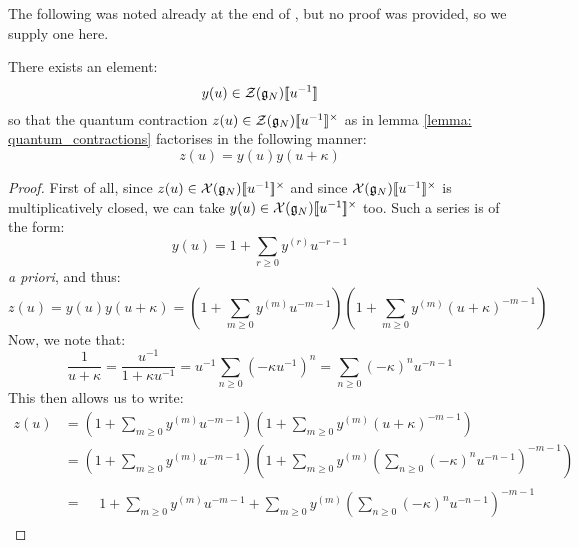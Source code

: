             The following was noted already at the end of \cite[Section 2]{guay_regelskis_twisted_yangians_for_symmetric_pairs_of_types_BCD}, but no proof was provided, so we supply one here.
            \begin{lemma} \label{lemma: quantum_pfaffians}
                There exists an element:
                    $$y(u) \in \calZ(\g_N)[\![u^{-1}]\!]$$
                so that the quantum contraction $z(u) \in \calZ(\g_N)[\![u^{-1}]\!]^{\x}$ as in lemma \ref{lemma: quantum_contractions} factorises in the following manner:
                    \begin{equation} \label{equation: quantum_pfaffians}
                        z(u) = y(u) y(u + \kappa)
                    \end{equation}
            \end{lemma}
                \begin{proof}
                    First of all, since $z(u) \in \calX(\g_N)[\![u^{-1}]\!]^{\x}$ and since $\calX(\g_N)[\![u^{-1}]\!]^{\x}$ is multiplicatively closed, we can take $y(u) \in \calX(\g_N)[\![u^{-1}]\!]^{\x}$ too. Such a series is of the form:
                        $$y(u) = 1 + \sum_{r \geq 0} y^{(r)} u^{-r - 1}$$
                    \textit{a priori}, and thus:
                        $$z(u) = y(u) y(u + \kappa) = \left( 1 + \sum_{m \geq 0} y^{(m)} u^{-m - 1} \right) \left( 1 + \sum_{m \geq 0} y^{(m)} (u + \kappa)^{-m - 1} \right)$$
                    Now, we note that:
                        $$\frac{1}{u + \kappa} = \frac{u^{-1}}{1 + \kappa u^{-1}} = u^{-1} \sum_{n \geq 0} (-\kappa u^{-1})^n = \sum_{n \geq 0} (-\kappa)^n u^{-n - 1}$$
                    This then allows us to write:
                        $$
                            \begin{aligned}
                                z(u) & = \left( 1 + \sum_{m \geq 0} y^{(m)} u^{-m - 1} \right) \left( 1 + \sum_{m \geq 0} y^{(m)} (u + \kappa)^{-m - 1} \right)
                                \\
                                & = \left( 1 + \sum_{m \geq 0} y^{(m)} u^{-m - 1} \right) \left( 1 + \sum_{m \geq 0} y^{(m)} \left( \sum_{n \geq 0} (-\kappa)^n u^{-n - 1} \right)^{-m - 1} \right)
                                \\
                                & =
                                \begin{aligned}
                                    & 1 + \sum_{m \geq 0} y^{(m)} u^{-m - 1} + \sum_{m \geq 0} y^{(m)} \left( \sum_{n \geq 0} (-\kappa)^n u^{-n - 1} \right)^{-m - 1}

\end{aligned}
\end{aligned}$$
\end{proof}
